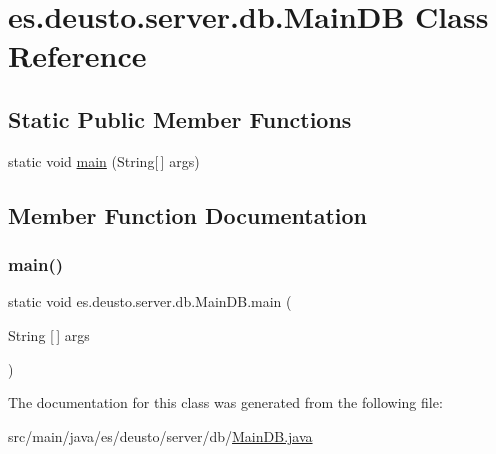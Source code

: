\hypertarget{classes_1_1deusto_1_1server_1_1db_1_1_main_d_b}{}\section{es.\+deusto.\+server.\+db.\+Main\+DB Class Reference}
\label{classes_1_1deusto_1_1server_1_1db_1_1_main_d_b}
\subsection*{Static Public Member Functions}
\begin{DoxyCompactItemize}
\item 
static void \mbox{\hyperlink{classes_1_1deusto_1_1server_1_1db_1_1_main_d_b_a4e68132e4e12a4c624f2b91bb8253cbe}{main}} (String\mbox{[}$\,$\mbox{]} args)
\end{DoxyCompactItemize}


\subsection{Member Function Documentation}
\mbox{\label{classes_1_1deusto_1_1server_1_1db_1_1_main_d_b_a4e68132e4e12a4c624f2b91bb8253cbe}} 
\subsubsection{\texorpdfstring{main()}{main()}}
{\footnotesize\ttfamily static void es.\+deusto.\+server.\+db.\+Main\+D\+B.\+main (\begin{DoxyParamCaption}\item[{String \mbox{[}$\,$\mbox{]}}]{args }\end{DoxyParamCaption})\hspace{0.3cm}{\ttfamily [static]}}



The documentation for this class was generated from the following file\+:\begin{DoxyCompactItemize}
\item 
src/main/java/es/deusto/server/db/\mbox{\hyperlink{_main_d_b_8java}{Main\+D\+B.\+java}}\end{DoxyCompactItemize}
